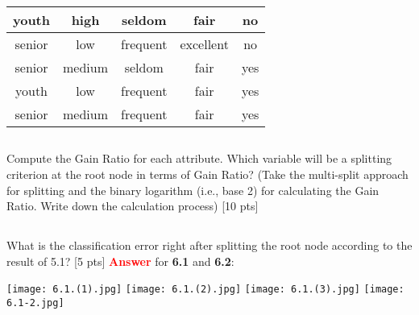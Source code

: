 \documentclass{homework}
\begin{document}
\begin{table}[!h]
\begin{center}
\begin{tabular}{|c|c|c|c|c|}
    youth        & high                                         & seldom                                 & fair                                        & no                                           \\ \hline
    senior       & low                                          & frequent                               & excellent                                   & no                                           \\ \hline
    senior       & medium                                       & seldom                                 & fair                                        & yes                                          \\ \hline
    youth        & low                                          & frequent                               & fair                                        & yes                                          \\ \hline
    senior       & medium                                       & frequent                               & fair                                        & yes                                          \\ \hline
    \end{tabular}
    \end{center}
    \end{table}
    \vspace{15mm}
    
    \subsection{}
    Compute the Gain Ratio for each attribute. Which variable will be a splitting criterion at the root node in terms of Gain Ratio? (Take the multi-split approach for splitting and the binary logarithm (i.e., base 2) for calculating the Gain Ratio. Write down the calculation process) [10 pts]
    
    \subsection{}
    What is the classification error right after splitting the root node according to the result of 5.1? [5 pts]
    \newpage
    \textbf{\textcolor{red}{Answer}} for \large{\textbf{6.1}} and \large{\textbf{6.2}}:
    
    \texttt{[image: 6.1.(1).jpg]}
    \texttt{[image: 6.1.(2).jpg]}
    \texttt{[image: 6.1.(3).jpg]}
    \texttt{[image: 6.1-2.jpg]}
    
    
        
     
  
\end{document}

